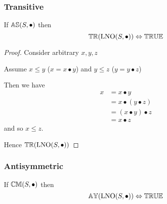 \documentclass[../Summary.tex]{subfiles}
\begin{document}
\subsubsection{Transitive}

\begin{theorem} \label{thm:lno_transitive}
If ${\mathbb{AS}}(S, \bullet)$ then
\begin{equation*}
{\mathbb{TR}}(\mathrm{LNO}(S,\bullet)) \Leftrightarrow  {\mathbb{TRUE}}
\end{equation*}
\end{theorem}

\begin{proof}

\vspace{0.5em}

Consider arbitrary $x,y,z$
\begin{ind}
Assume $x \leq y$ ($x = x \bullet y$) and $y \leq z$ ($y = y \bullet z$)

\begin{ind}
Then we have
\begin{align*}
x 	& = x \bullet y \\
	& = x \bullet (y \bullet z) \\
	& = (x \bullet y) \bullet z \\
	& = x \bullet z
\end{align*}
and so $x \leq z$.

\end{ind}
\end{ind}

Hence ${\mathbb{TR}}(\mathrm{LNO}(S,\bullet))$
\end{proof}




\subsubsection{Antisymmetric}

\begin{theorem} \label{thm:lno_antisymmetric}
If ${\mathbb{CM}}(S, \bullet)$ then
\begin{equation*}
{\mathbb{AY}}(\mathrm{LNO}(S,\bullet)) \Leftrightarrow {\mathbb{TRUE}}
\end{equation*}
\end{theorem}
\end{document}
